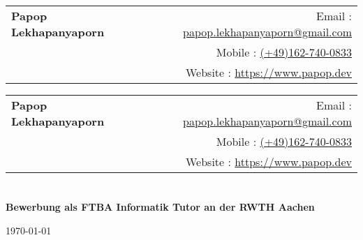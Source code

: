 \documentclass[12pt]{article}
\makeatletter
\newcommand{\heading}{\begin{tabular*}{\textwidth}{l@{\extracolsep{\fill}}r}
  \textbf{\sffamily\Huge Papop Lekhapanyaporn} & Email : \href{mailto:papop.lekhapanyaporn@gmail.com}{papop.lekhapanyaporn@gmail.com}\\
  \smallskip{\large{}} & Mobile : \href{tel:+491627400833}{(+49)162-740-0833} \\
  &Website : \href{https://papop.dev/}{https://www.papop.dev}
\end{tabular*}}
\newcommand{\coverletter}[3]{
  
  \section{}
  \textbf{Bewerbung als #1 an der #2}\\
  
  #3
  \vspace*{\fill}
}
\makeatother
\begin{document}
\heading

\newpage

\heading
\coverletter{FTBA Informatik Tutor}{RWTH Aachen}{
  \vspace{0.2in}
  \begin{flushright}
  \today\\
  \end{flushright}
  \vspace{0.2in}
  \vspace{-0.1in}\setlength\parindent{24pt}
  \noindent
  
}
\end{document}
